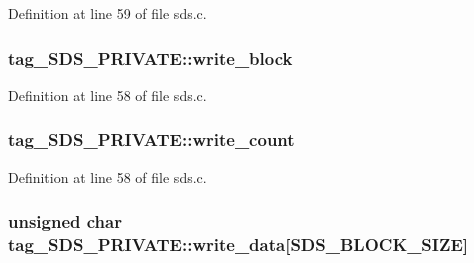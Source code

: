 Definition at line 59 of file sds.\+c.

\subsubsection[{\texorpdfstring{write\+\_\+block}{write_block}}]{ tag\+\_\+\+S\+D\+S\+\_\+\+P\+R\+I\+V\+A\+T\+E\+::write\+\_\+block}\hypertarget{structtag___s_d_s___p_r_i_v_a_t_e_abf8cb53c64849f7045fdbb2c4db77b01}{}\label{structtag___s_d_s___p_r_i_v_a_t_e_abf8cb53c64849f7045fdbb2c4db77b01}


Definition at line 58 of file sds.\+c.

\subsubsection[{\texorpdfstring{write\+\_\+count}{write_count}}]{ tag\+\_\+\+S\+D\+S\+\_\+\+P\+R\+I\+V\+A\+T\+E\+::write\+\_\+count}\hypertarget{structtag___s_d_s___p_r_i_v_a_t_e_a2307c65ee697648e89cd92ce64f3448f}{}\label{structtag___s_d_s___p_r_i_v_a_t_e_a2307c65ee697648e89cd92ce64f3448f}


Definition at line 58 of file sds.\+c.

\subsubsection[{\texorpdfstring{write\+\_\+data}{write_data}}]{\setlength{\rightskip}{0pt plus 5cm}unsigned char tag\+\_\+\+S\+D\+S\+\_\+\+P\+R\+I\+V\+A\+T\+E\+::write\+\_\+data\mbox{[}{\bf S\+D\+S\+\_\+\+B\+L\+O\+C\+K\+\_\+\+S\+I\+ZE}\mbox{]}}\hypertarget{structtag___s_d_s___p_r_i_v_a_t_e_a399f9603046c205232d55a93c63101d5}{}\label{structtag___s_d_s___p_r_i_v_a_t_e_a399f9603046c205232d55a93c63101d5}


